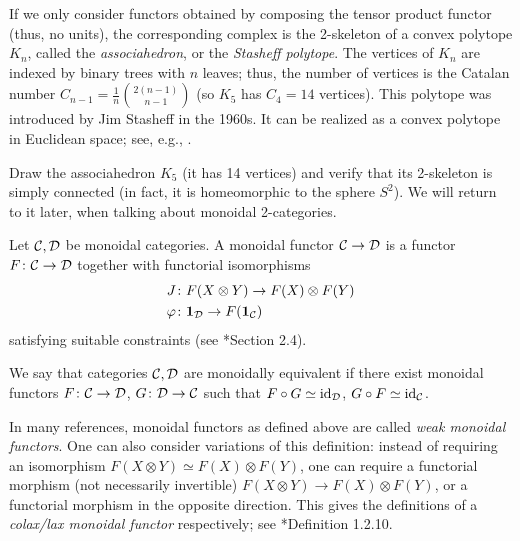 \begin{remark}\label{r:stasheff}
  If we only consider functors obtained by composing the tensor product functor
  (thus, no units), the corresponding complex is the 2-skeleton of a convex
  polytope $K_n$, called the \emph{associahedron}, or the
  \emph{Stasheff
  polytope}. The vertices of $K_n$ are indexed by
  binary trees with $n$ leaves; thus, the number of vertices is the Catalan
  number $C_{n-1} = \frac{1}{n}\binom{2(n-1)}{n-1}$ (so $K_5$ has
  $C_4 = 14$ vertices).
  This polytope was introduced by Jim Stasheff in the 1960s. It can be realized
  as a convex polytope in Euclidean space; see, e.g.,
  .
\end{remark}

\begin{exercise}\label{ec:K5}
  Draw the associahedron $K_5$ (it has 14 vertices) and verify that its
  2-skeleton is simply connected (in fact, it is homeomorphic to the sphere
  $S^2$). We will return to it later, when talking about monoidal 2-categories.
\end{exercise}

\begin{definition}\label{d:monoidal_functor}
  Let $\mathcal{C}, \mathcal{D}$ be monoidal categories. A monoidal functor
  $\mathcal{C}\to \mathcal{D}$ is a functor $F\colon\mathcal{C}\to\mathcal{D}$ together
  with functorial isomorphisms
  \begin{align*}
    J&\colon F(X\otimes Y)\to F(X)\otimes F(Y)\\
    \varphi&\colon \mathbf{1}_{\mathcal{D}}\to F(\mathbf{1}_{\mathcal{C}})
  \end{align*}
  satisfying suitable constraints (see *{Section 2.4}).

  We say that categories $\mathcal{C}, \mathcal{D}$ are monoidally equivalent
  if there exist monoidal functors $F\colon \mathcal{C}\to \mathcal{D}$, $G\colon \mathcal{D}\to
  \mathcal{C}$ such that $F\circ G\simeq \operatorname{id}_{\mathcal{D}}$, $G\circ F \simeq \operatorname{id}_{\mathcal{C}}$.
\end{definition}

\begin{remark}\label{r:lax}
  In many references, monoidal functors as defined above are called \emph{weak
  monoidal functors}. One can also consider variations of this definition:
  instead of requiring an isomorphism $F(X\otimes Y)\simeq F(X)\otimes F(Y)$,
  one can require a functorial morphism (not necessarily invertible)
  $F(X\otimes Y)\to F(X)\otimes F(Y)$, or a functorial morphism in the opposite
  direction.  This gives the definitions of a \emph{colax/lax monoidal functor}
  respectively; see *{Definition 1.2.10}.
\end{remark}



